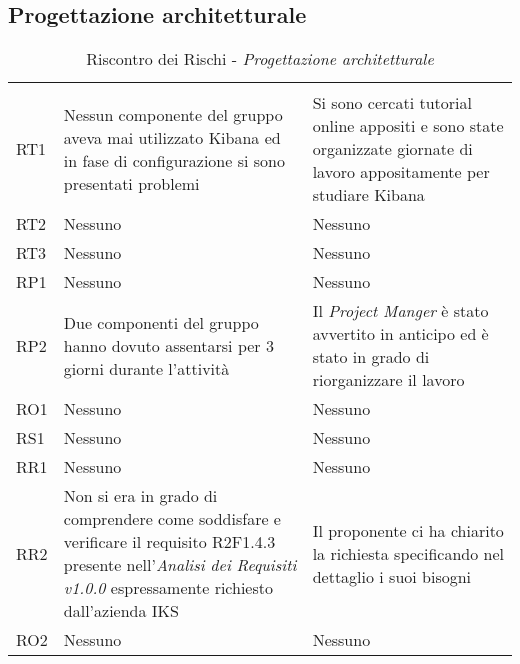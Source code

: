 \subsection{Progettazione architetturale}
\begin{table}[H]
	\centering
	\begin{tabular}{|C{2.5cm}|C{5cm}|C{5cm}|}
		 & & \\
		RT1  & Nessun componente del gruppo aveva mai utilizzato Kibana ed in fase di configurazione si sono presentati problemi & Si sono cercati tutorial online appositi e sono state organizzate giornate di lavoro appositamente per studiare Kibana \\
		\hline
		RT2  & Nessuno & Nessuno \\
		\hline
		RT3  & Nessuno & Nessuno \\
		\hline
		RP1  & Nessuno & Nessuno \\
		\hline
		RP2  & Due componenti del gruppo hanno dovuto assentarsi per 3 giorni durante l'attività & Il \textit{Project Manger} è stato avvertito in anticipo ed è stato in grado di riorganizzare il lavoro \\
		\hline
		RO1  & Nessuno & Nessuno \\
		\hline
		RS1  & Nessuno & Nessuno \\
		\hline
		RR1  & Nessuno & Nessuno \\
		\hline
		RR2  & Non si era in grado di comprendere come soddisfare e verificare il requisito R2F1.4.3 presente nell'\textit{Analisi dei Requisiti v1.0.0} espressamente richiesto dall'azienda IKS & Il proponente ci ha chiarito la richiesta specificando nel dettaglio i suoi bisogni\\
		\hline
		RO2  & Nessuno & Nessuno \\
		\hline
	\end{tabular}
	\caption{Riscontro dei Rischi - \textit{Progettazione architetturale}}
\end{table}